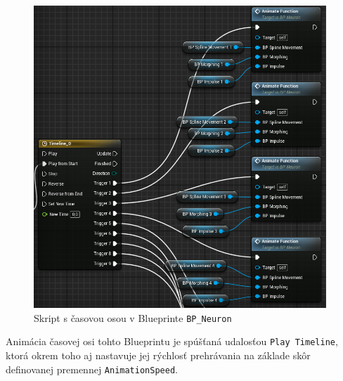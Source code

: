 \begin{figure}[!htbp]
  \centering
  \includegraphics[width=11cm]{img/main-timeline.png}
  \caption{Skript s časovou osou v Blueprinte \texttt{BP\_Neuron}}
  \label{main-timeline}
\end{figure}

Animácia časovej osi tohto Blueprintu je spúšťaná udalosťou \texttt{Play Timeline}, ktorá okrem toho aj nastavuje jej rýchlosť prehrávania na základe skôr definovanej premennej \texttt{AnimationSpeed}.

